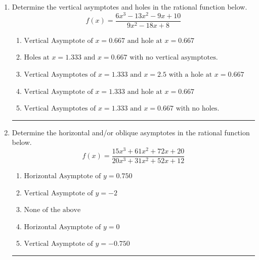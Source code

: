 \documentclass[14pt]{extbook}
\newcommand{\litem}[1]{\item#1\hspace*{-1cm}\rule{\textwidth}{0.4pt}}
\begin{document}
\begin{enumerate}
{\begin{enumerate}[label=\Alph*.]
\end{enumerate} }
\litem{
Determine the vertical asymptotes and holes in the rational function below.\[ f(x) = \frac{6x^{3} -13 x^{2} -9 x + 10}{9x^{2} -18 x + 8} \]\begin{enumerate}[label=\Alph*.]
\item \( \text{Vertical Asymptote of } x = 0.667 \text{ and hole at } x = 0.667 \)
\item \( \text{Holes at } x = 1.333 \text{ and } x = 0.667 \text{ with no vertical asymptotes.} \)
\item \( \text{Vertical Asymptotes of } x = 1.333 \text{ and } x = 2.5 \text{ with a hole at } x = 0.667 \)
\item \( \text{Vertical Asymptote of } x = 1.333 \text{ and hole at } x = 0.667 \)
\item \( \text{Vertical Asymptotes of } x = 1.333 \text{ and } x = 0.667 \text{ with no holes.} \)

\end{enumerate} }
\litem{
Determine the horizontal and/or oblique asymptotes in the rational function below.\[ f(x) = \frac{15x^{3} +61 x^{2} +72 x + 20}{20x^{3} +31 x^{2} +52 x + 12} \]\begin{enumerate}[label=\Alph*.]
\item \( \text{Horizontal Asymptote of } y = 0.750  \)
\item \( \text{Vertical Asymptote of } y = -2  \)
\item \( \text{None of the above} \)
\item \( \text{Horizontal Asymptote of } y = 0  \)
\item \( \text{Vertical Asymptote of } y = -0.750  \)

\end{enumerate} }
\end{enumerate}
\end{document}

